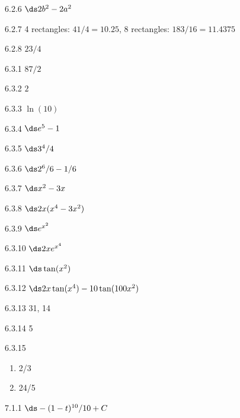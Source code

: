 \begin{Answer}{6.2.6}
 $\ds 2b^2-2a^2$
\end{Answer}
\begin{Answer}{6.2.7}
 4 rectangles: $41/4=10.25$,
8 rectangles: $183/16= 11.4375$
\end{Answer}
\begin{Answer}{6.2.8}
 $ 23/4$
\end{Answer}
\begin{Answer}{6.3.1}
 $87/2$
\end{Answer}
\begin{Answer}{6.3.2}
 $2$
\end{Answer}
\begin{Answer}{6.3.3}
 $\ln(10)$
\end{Answer}
\begin{Answer}{6.3.4}
 $\ds e^5-1$
\end{Answer}
\begin{Answer}{6.3.5}
 $\ds 3^4/4$
\end{Answer}
\begin{Answer}{6.3.6}
 $\ds 2^6/6 -1/6$
\end{Answer}
\begin{Answer}{6.3.7}
 $\ds x^2-3x$
\end{Answer}
\begin{Answer}{6.3.8}
 $\ds 2x(x^4-3x^2)$
\end{Answer}
\begin{Answer}{6.3.9}
 $\ds e^{x^2}$
\end{Answer}
\begin{Answer}{6.3.10}
 $\ds 2xe^{x^4}$
\end{Answer}
\begin{Answer}{6.3.11}
 $\ds \tan(x^2)$
\end{Answer}
\begin{Answer}{6.3.12}
 $\ds 2x\tan(x^4)-10\tan(100x^2)$
\end{Answer}
\begin{Answer}{6.3.13}
	31, 14
\end{Answer}
\begin{Answer}{6.3.14}
	5
\end{Answer}
\begin{Answer}{6.3.15}
\begin{enumerate}
	\item	2/3
	\item	24/5
\end{enumerate}
\end{Answer}
\begin{Answer}{7.1.1}
 $\ds -(1-t)^{10}/10+C$
\end{Answer}
